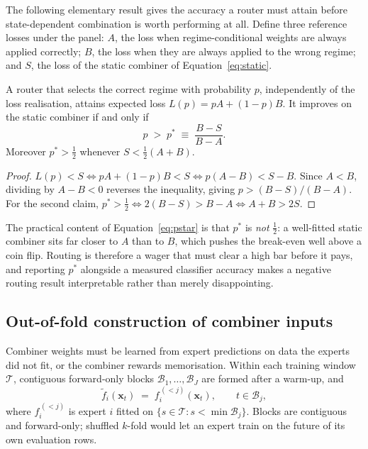 The following elementary result gives the accuracy a router must attain before
state-dependent combination is worth performing at all. Define three reference
losses under the panel: $A$, the loss when regime-conditional weights are always
applied correctly; $B$, the loss when they are always applied to the wrong regime;
and $S$, the loss of the static combiner of Equation~\ref{eq:static}.

\begin{proposition}
A router that selects the correct regime with probability $p$, independently of
the loss realisation, attains expected loss $L(p) = pA + (1-p)B$. It improves on
the static combiner if and only if
\begin{equation}
\label{eq:pstar}
p \;>\; p^{*} \;\equiv\; \frac{B-S}{B-A}.
\end{equation}
Moreover $p^{*} > \tfrac{1}{2}$ whenever $S < \tfrac{1}{2}(A+B)$.
\end{proposition}

\begin{proof}
$L(p) < S \iff pA + (1-p)B < S \iff p(A-B) < S-B$. Since $A<B$, dividing by
$A-B<0$ reverses the inequality, giving $p > (B-S)/(B-A)$. For the second claim,
$p^{*}>\tfrac12 \iff 2(B-S) > B-A \iff A+B > 2S$.
\end{proof}

The practical content of Equation~\ref{eq:pstar} is that $p^{*}$ is \emph{not}
$\tfrac{1}{2}$: a well-fitted static combiner sits far closer to $A$ than to $B$,
which pushes the break-even well above a coin flip. Routing is therefore a wager
that must clear a high bar before it pays, and reporting $p^{*}$ alongside a
measured classifier accuracy makes a negative routing result interpretable rather
than merely disappointing.

\subsection{Out-of-fold construction of combiner inputs}
\label{sec:oof}

Combiner weights must be learned from expert predictions on data the experts did
not fit, or the combiner rewards memorisation. Within each training window
$\mathcal{T}$, contiguous forward-only blocks $\mathcal{B}_1,\dots,\mathcal{B}_J$
are formed after a warm-up, and
\begin{equation}
\tilde{f}_i(\bm{x}_t) \;=\; f_i^{\,(<\!j)}(\bm{x}_t),
\qquad t \in \mathcal{B}_j ,
\end{equation}
where $f_i^{\,(<\!j)}$ is expert $i$ fitted on $\{s \in \mathcal{T} : s < \min \mathcal{B}_j\}$.
Blocks are contiguous and forward-only; shuffled $k$-fold would let an expert
train on the future of its own evaluation rows.

